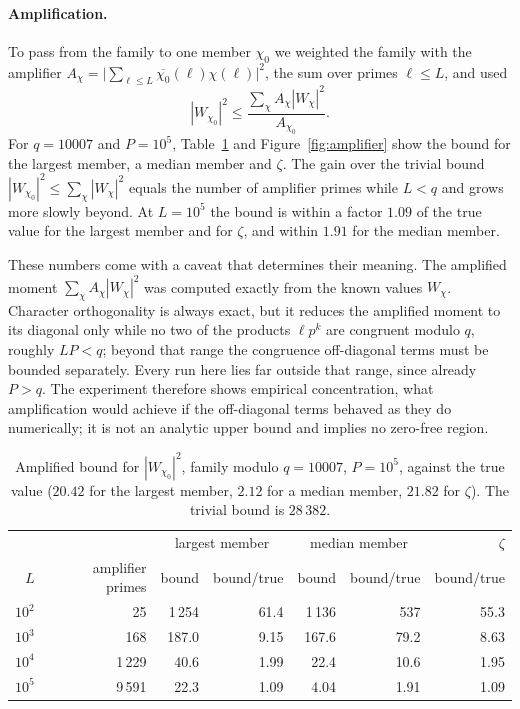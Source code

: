 \documentclass[11pt,a4paper]{article}
\theoremstyle{definition}\newtheorem{definition}[proposition]{Definition}
\theoremstyle{remark}\newtheorem{remark}[proposition]{Remark}
\begin{document}
\paragraph{Amplification.} To pass from the family to one member $\chi_0$ we weighted the family with the amplifier $A_\chi=\bigl|\sum_{\ell\le L}\overline{\chi_0}(\ell)\chi(\ell)\bigr|^2$, the sum over primes $\ell\le L$, and used
\[
|W_{\chi_0}|^2\le\frac{\sum_\chi A_\chi|W_\chi|^2}{A_{\chi_0}}.
\]
For $q=10007$ and $P=10^5$, Table~\ref{tab:amplifier} and Figure~\ref{fig:amplifier} show the bound for the largest member, a median member and $\zeta$. The gain over the trivial bound $|W_{\chi_0}|^2\le\sum_\chi|W_\chi|^2$ equals the number of amplifier primes while $L<q$ and grows more slowly beyond. At $L=10^5$ the bound is within a factor $1.09$ of the true value for the largest member and for $\zeta$, and within $1.91$ for the median member.

These numbers come with a caveat that determines their meaning. The amplified moment $\sum_\chi A_\chi|W_\chi|^2$ was computed exactly from the known values $W_\chi$. Character orthogonality is always exact, but it reduces the amplified moment to its diagonal only while no two of the products $\ell p^k$ are congruent modulo $q$, roughly $LP<q$; beyond that range the congruence off-diagonal terms must be bounded separately. Every run here lies far outside that range, since already $P>q$. The experiment therefore shows empirical concentration, what amplification would achieve if the off-diagonal terms behaved as they do numerically; it is not an analytic upper bound and implies no zero-free region.

\begin{table}[ht]\centering\small
\caption{Amplified bound for $|W_{\chi_0}|^2$, family modulo $q=10007$, $P=10^5$, against the true value ($20.42$ for the largest member, $2.12$ for a median member, $21.82$ for $\zeta$). The trivial bound is $28\,382$.}\label{tab:amplifier}
\begin{tabular}{rrrrrrr}
\toprule
 & & \multicolumn{2}{c}{largest member} & \multicolumn{2}{c}{median member} & $\zeta$\\
$L$ & amplifier primes & bound & bound/true & bound & bound/true & bound/true\\
\midrule
$10^2$ & 25 & 1\,254 & 61.4 & 1\,136 & 537 & 55.3\\
$10^3$ & 168 & 187.0 & 9.15 & 167.6 & 79.2 & 8.63\\
$10^4$ & 1\,229 & 40.6 & 1.99 & 22.4 & 10.6 & 1.95\\
$10^5$ & 9\,591 & 22.3 & 1.09 & 4.04 & 1.91 & 1.09\\
\bottomrule
\end{tabular}
\end{table}
\end{document}
